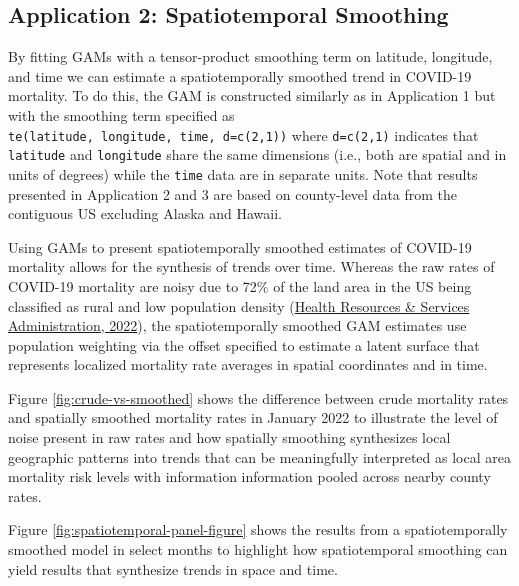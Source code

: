 \documentclass[
]{article}
\begin{document}
\newpage

\hypertarget{application-2-spatiotemporal-smoothing}{%
\subsection{Application 2: Spatiotemporal Smoothing}\label{application-2-spatiotemporal-smoothing}}

By fitting GAMs with a tensor-product smoothing term on latitude, longitude, and
time we can estimate a spatiotemporally smoothed trend in COVID-19 mortality. To
do this, the GAM is constructed similarly as in Application 1 but with the
smoothing term specified as \texttt{te(latitude,\ longitude,\ time,\ d=c(2,1))} where
\texttt{d=c(2,1)} indicates that \texttt{latitude} and \texttt{longitude} share the same dimensions
(i.e., both are spatial and in units of degrees) while the \texttt{time} data are in
separate units. Note that results presented in Application 2 and 3 are based on
county-level data from the contiguous US excluding Alaska and Hawaii.

Using GAMs to present spatiotemporally smoothed estimates of COVID-19 mortality
allows for the synthesis of trends over time. Whereas the raw rates of COVID-19
mortality are noisy due to 72\% of the land area in the US being classified as
rural and low population density (\protect\hyperlink{ref-health_resources__services_administration_defining_2022}{Health Resources \& Services Administration, 2022}), the spatiotemporally smoothed GAM estimates
use population weighting via the offset specified to estimate a latent surface
that represents localized mortality rate averages in spatial coordinates and in
time.

Figure \ref{fig:crude-vs-smoothed} shows the difference between crude mortality
rates and spatially smoothed mortality rates in January 2022 to illustrate the
level of noise present in raw rates and how spatially smoothing synthesizes
local geographic patterns into trends that can be meaningfully
interpreted as local area mortality risk levels with information information pooled across
nearby county rates.

Figure \ref{fig:spatiotemporal-panel-figure} shows the results from a
spatiotemporally smoothed model in select months to highlight how spatiotemporal
smoothing can yield results that synthesize trends in space and
time.
\end{document}
